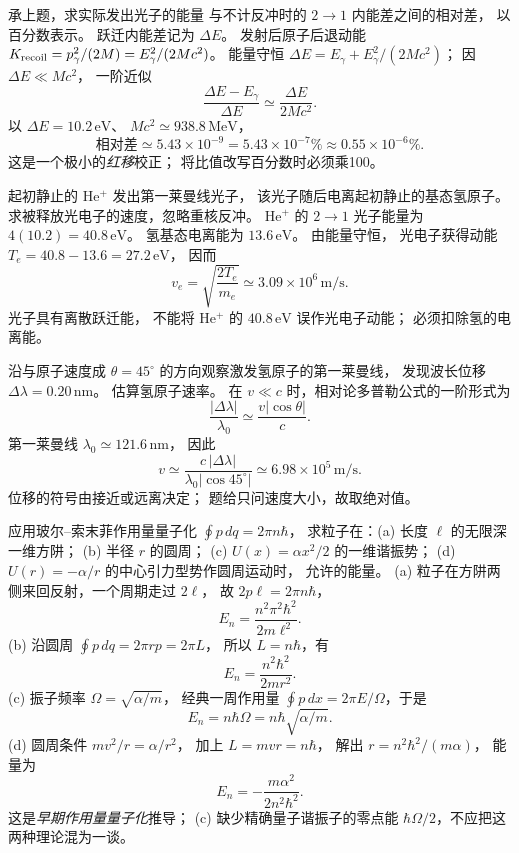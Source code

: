 承上题，求实际发出光子的能量
与不计反冲时的 $2\to1$ 内能差之间的相对差，
以百分数表示。
\exsolution
跃迁内能差记为 $\Delta E$。
发射后原子后退动能
$K_{\rm recoil}=p_\gamma^2/(2M)
=E_\gamma^2/(2Mc^2)$。
能量守恒
$\Delta E=E_\gamma+E_\gamma^2/(2Mc^2)$；
因 $\Delta E\ll Mc^2$，
一阶近似
\[
 \frac{\Delta E-E_\gamma}{\Delta E}
 \simeq\frac{\Delta E}{2Mc^2}.
\]
以 $\Delta E=10.2\,\mathrm{eV}$、
$Mc^2\simeq938.8\,\mathrm{MeV}$，
\[
 \boxed{\text{相对差}\simeq
 5.43\times10^{-9}
 =5.43\times10^{-7}\%\approx0.55\times10^{-6}\%}.
\]
\excheck 这是一个极小的\emph{红移}校正；
将比值改写百分数时必须乘100。

起初静止的 He$^+$ 发出第一莱曼线光子，
该光子随后电离起初静止的基态氢原子。
求被释放光电子的速度，忽略重核反冲。
\exsolution
He$^+$ 的 $2\to1$ 光子能量为
$4(10.2)=40.8\,\mathrm{eV}$。
氢基态电离能为
$13.6\,\mathrm{eV}$。
由能量守恒，
光电子获得动能
$T_e=40.8-13.6=27.2\,\mathrm{eV}$，
因而
\[
 \boxed{v_e=\sqrt{\frac{2T_e}{m_e}}
 \simeq3.09\times10^6\,\mathrm{m/s}}.
\]
\excheck 光子具有离散跃迁能，
不能将 He$^+$ 的 $40.8\,\mathrm{eV}$ 误作光电子动能；
必须扣除氢的电离能。

沿与原子速度成 $\theta=45^\circ$
的方向观察激发氢原子的第一莱曼线，
发现波长位移 $\Delta\lambda=0.20\,\mathrm{nm}$。
估算氢原子速率。
\exsolution
在 $v\ll c$ 时，相对论多普勒公式的一阶形式为
\[
 \frac{|\Delta\lambda|}{\lambda_0}
 \simeq\frac{v|\cos\theta|}{c}.
\]
第一莱曼线
$\lambda_0\simeq121.6\,\mathrm{nm}$，
因此
\[
 \boxed{v\simeq
 \frac{c\,|\Delta\lambda|}
 {\lambda_0|\cos45^\circ|}
 \simeq6.98\times10^5\,\mathrm{m/s}}.
\]
\excheck 位移的符号由接近或远离决定；
题给只问速度大小，故取绝对值。

应用玻尔--索末菲作用量量子化
$\oint p\,dq=2\pi n\hbar$，
求粒子在：(a) 长度 $\ell$ 的无限深一维方阱；
(b) 半径 $r$ 的圆周；
(c) $U(x)=\alpha x^2/2$ 的一维谐振势；
(d) $U(r)=-\alpha/r$ 的中心引力型势作圆周运动时，
允许的能量。
\exsolution
(a) 粒子在方阱两侧来回反射，一个周期走过 $2\ell$，
故 $2p\ell=2\pi n\hbar$，
\[
 \boxed{E_n=\frac{n^2\pi^2\hbar^2}{2m\ell^2}}.
\]
(b) 沿圆周 $\oint p\,dq=2\pi rp=2\pi L$，
所以 $L=n\hbar$，有
\[
 \boxed{E_n=\frac{n^2\hbar^2}{2mr^2}}.
\]
(c) 振子频率 $\Omega=\sqrt{\alpha/m}$，
经典一周作用量
$\oint p\,dx=2\pi E/\Omega$，于是
\[
 \boxed{E_n=n\hbar\Omega=n\hbar\sqrt{\alpha/m}}.
\]
(d) 圆周条件 $mv^2/r=\alpha/r^2$，
加上 $L=mvr=n\hbar$，
解出
$r=n^2\hbar^2/(m\alpha)$，
能量为
\[
 \boxed{E_n=-\frac{m\alpha^2}{2n^2\hbar^2}}.
\]
\excheck 这是\emph{早期作用量量子化}推导；
(c) 缺少精确量子谐振子的零点能
$\hbar\Omega/2$，不应把这两种理论混为一谈。

